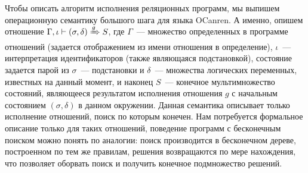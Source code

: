     Чтобы описать алгоритм исполнения реляционных программ, мы выпишем операционную семантику большого шага для языка OCanren. А именно, опишем отношение \mbox{$\Gamma, \iota \vdash (\sigma, \delta) \xRightarrow{g} S$}, где $\Gamma$~--- множество определенных в программе отношений (задается отображением из имени отношения в определение), $\iota$~--- интерпретация идентификаторов (также являющаяся подстановкой), состояние задается парой из $\sigma$~--- подстановки и $\delta$~--- множества логических переменных,  известных на данный момент, и наконец $S$~--- конечное мультимножество состояний, являющееся результатом исполнения отношения $g$ с начальным состоянием $(\sigma, \delta)$ в данном окружении. Данная семантика описывает только исполнение отношений, поиск по которым конечен. Нам потребуется формальное описание только для таких отношений, поведение программ с бесконечным поиском можно понять по аналогии: поиск производится в бесконечном дереве, построенном по тем же правилам, решения возвращаются по мере нахождения, что позволяет оборвать поиск и получить конечное подмножество решений.
    

